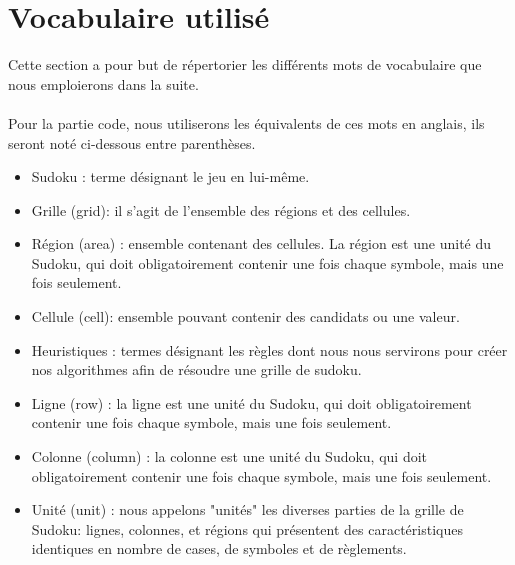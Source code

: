 \section{Vocabulaire utilisé}
Cette section a pour but de répertorier 
les différents mots de vocabulaire que nous emploierons dans la suite.\\
\\
Pour la partie code, nous utiliserons les équivalents 
de ces mots en anglais, ils seront noté ci-dessous entre parenthèses.

\begin{itemize}
 \item Sudoku : terme désignant le jeu en lui-même. \\
 
 \item Grille (grid): il s'agit de l'ensemble des régions et des cellules. \\
 
 \item Région (area) : ensemble contenant des cellules. La région est une unité du Sudoku, qui doit obligatoirement contenir une fois chaque 
  symbole, mais une fois seulement. \\
 
 \item Cellule (cell): ensemble pouvant contenir des candidats ou une valeur. \\
 
 \item Heuristiques : termes désignant les règles 
 dont nous nous servirons pour créer nos algorithmes afin de résoudre une grille de sudoku. \\ 
  
 \item Ligne (row) :
 la ligne est une unité du Sudoku, qui doit obligatoirement contenir une fois chaque  
 symbole, mais une fois seulement. \\
 
 \item Colonne (column) :
  la colonne est une unité du Sudoku, qui doit obligatoirement contenir une fois chaque 
  symbole, mais une fois seulement. \\
  
  \item Unité (unit) :
  nous appelons "unités" les diverses parties de la grille de Sudoku: lignes, colonnes, 
  et régions qui présentent des caractéristiques identiques en nombre de cases, 
  de symboles et de règlements. \\
  

\end{itemize}
